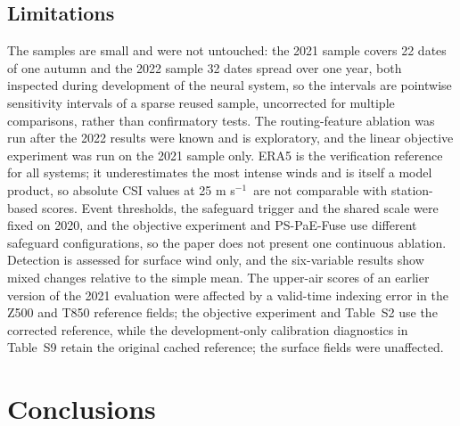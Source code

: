 \documentclass[12pt]{article}
\newcommand{\mps}{m s$^{-1}$}
\begin{document}
\subsection{Limitations}
\label{sec:limitations}

The samples are small and were not untouched: the 2021 sample covers 22 dates of one autumn and the 2022 sample 32 dates spread over one year, both inspected during development of the neural system, so the intervals are pointwise sensitivity intervals of a sparse reused sample, uncorrected for multiple comparisons, rather than confirmatory tests. The routing-feature ablation was run after the 2022 results were known and is exploratory, and the linear objective experiment was run on the 2021 sample only. ERA5 is the verification reference for all systems; it underestimates the most intense winds and is itself a model product, so absolute CSI values at 25 \mps\ are not comparable with station-based scores. Event thresholds, the safeguard trigger and the shared scale were fixed on 2020, and the objective experiment and PS-PaE-Fuse use different safeguard configurations, so the paper does not present one continuous ablation. Detection is assessed for surface wind only, and the six-variable results show mixed changes relative to the simple mean. The upper-air scores of an earlier version of the 2021 evaluation were affected by a valid-time indexing error in the Z500 and T850 reference fields; the objective experiment and Table~S2 use the corrected reference, while the development-only calibration diagnostics in Table~S9 retain the original cached reference; the surface fields were unaffected.

\section{Conclusions}
\label{sec:conclusions}
\end{document}

